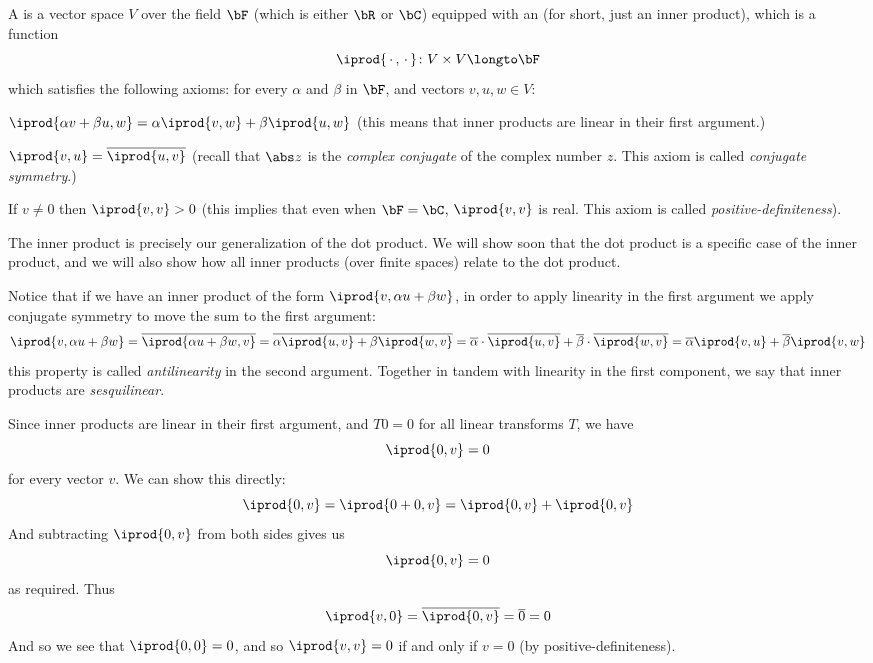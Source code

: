 \begin{defn*}

    A  is a vector space $V$ over the field $\bF$ (which is either $\bR$ or $\bC$) equipped with an  (for short, just an inner product), which is a
    function
    \[ \iprod{\,\cdot\,,\,\cdot\,}\colon V\times V\longto\bF \]
    which satisfies the following axioms: for every $\alpha$ and $\beta$ in $\bF$, and vectors $v,u,w\in V$:
    \benum
        \item $\iprod{\alpha v+\beta u,w} = \alpha\iprod{v,w} + \beta\iprod{u,w}$ (this means that inner products are linear in their first argument.)
        \item $\iprod{v,u}=\overline{\iprod{u,v}}$ (recall that $\abs z$ is the \emph{complex conjugate} of the complex number $z$.
        This axiom is called \emph{conjugate symmetry}.)
        \item If $v\neq0$ then $\iprod{v,v}>0$ (this implies that even when $\bF=\bC$, $\iprod{v,v}$ is real.
        This axiom is called \emph{positive-definiteness}).
    \eenum

\end{defn*}

The inner product is precisely our generalization of the dot product.
We will show soon that the dot product is a specific case of the inner product, and we will also show how all inner products (over finite spaces) relate to the dot product.

Notice that if we have an inner product of the form $\iprod{v,\alpha u+\beta w}$, in order to apply linearity in the first argument we apply conjugate symmetry to move the sum to the first argument:
\[ \iprod{v,\alpha u+\beta w} = \overline{\iprod{\alpha u+\beta w,v}} = \overline{\alpha\iprod{u,v} + \beta\iprod{w,v}} =
\overline\alpha\cdot\overline{\iprod{u,v}} + \overline\beta\cdot\overline{\iprod{w,v}} = \overline\alpha\iprod{v,u} + \overline\beta\iprod{v,w} \]
this property is called \emph{antilinearity} in the second argument.
Together in tandem with linearity in the first component, we say that inner products are \emph{sesquilinear}.

Since inner products are linear in their first argument, and $T0=0$ for all linear transforms $T$, we have
\[ \iprod{0,v} = 0 \]
for every vector $v$.
We can show this directly:
\[ \iprod{0,v} = \iprod{0+0,v} = \iprod{0,v} + \iprod{0,v} \]
And subtracting $\iprod{0,v}$ from both sides gives us
\[ \iprod{0,v} = 0 \]
as required.
Thus
\[ \iprod{v,0} = \overline{\iprod{0,v}} = \overline0 = 0 \]
And so we see that $\iprod{0,0}=0$, and so $\iprod{v,v}=0$ if and only if $v=0$ (by positive-definiteness).


